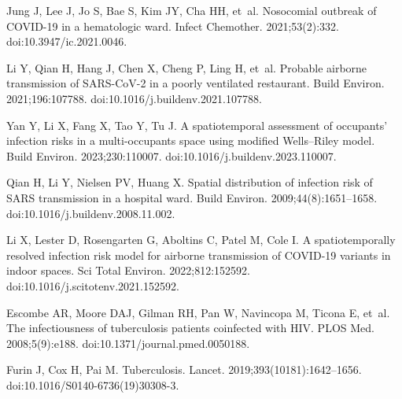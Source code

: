 \documentclass[fleqn,11pt]{wlscirep}
\begin{document}
\begin{thebibliography}{10}
Jung J, Lee J, Jo S, Bae S, Kim JY, Cha HH, et~al.
\newblock Nosocomial outbreak of {COVID}-19 in a hematologic ward.
\newblock Infect Chemother. 2021;53(2):332.
\newblock doi:10.3947/ic.2021.0046.

Li Y, Qian H, Hang J, Chen X, Cheng P, Ling H, et~al.
\newblock Probable airborne transmission of {SARS}-{CoV}-2 in a poorly
  ventilated restaurant.
\newblock Build Environ. 2021;196:107788.
\newblock doi:10.1016/j.buildenv.2021.107788.

Yan Y, Li X, Fang X, Tao Y, Tu J.
\newblock A spatiotemporal assessment of occupants’ infection risks in a
  multi-occupants space using modified {Wells}–{Riley} model.
\newblock Build Environ. 2023;230:110007.
\newblock doi:10.1016/j.buildenv.2023.110007.

Qian H, Li Y, Nielsen PV, Huang X.
\newblock Spatial distribution of infection risk of {SARS} transmission in a
  hospital ward.
\newblock Build Environ. 2009;44(8):1651--1658.
\newblock doi:10.1016/j.buildenv.2008.11.002.

Li X, Lester D, Rosengarten G, Aboltins C, Patel M, Cole I.
\newblock A spatiotemporally resolved infection risk model for airborne
  transmission of {COVID}-19 variants in indoor spaces.
\newblock Sci Total Environ. 2022;812:152592.
\newblock doi:10.1016/j.scitotenv.2021.152592.

Escombe AR, Moore DAJ, Gilman RH, Pan W, Navincopa M, Ticona E, et~al.
\newblock The infectiousness of tuberculosis patients coinfected with {HIV}.
\newblock PLOS Med. 2008;5(9):e188.
\newblock doi:10.1371/journal.pmed.0050188.

Furin J, Cox H, Pai M.
\newblock Tuberculosis.
\newblock Lancet. 2019;393(10181):1642--1656.
\newblock doi:10.1016/S0140-6736(19)30308-3.

\end{thebibliography}
\end{document}
